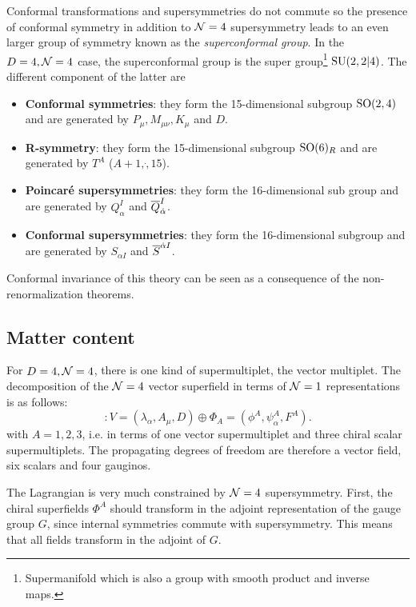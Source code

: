 \documentclass[a4paper,11pt]{article}
\begin{document}
        Conformal transformations and supersymmetries do not commute so the presence of conformal symmetry in addition to $\mathcal{N}=4$ supersymmetry leads to an even larger group of symmetry known as the \emph{superconformal group}. In the $D=4,\mathcal{N}=4$ case, the superconformal group is the super group\footnote{Supermanifold which is also a group with smooth product and inverse maps.} $\text{SU}(2,2|4)$. The different component of the latter are
        \begin{itemize}
            \item \textbf{Conformal symmetries}: they form the 15-dimensional subgroup $\text{SO}(2,4)$ and are generated by $P_\mu,M_{\mu\nu},K_\mu$ and $D$.
            \item \textbf{R-symmetry}: they form the 15-dimensional subgroup $\text{SO}(6)_R$ and are generated by $T^A$ ($A+1,\dot,15$).
            \item \textbf{Poincaré supersymmetries}: they form the 16-dimensional sub group \marker and are generated by $Q^I_\alpha$ and $\overline{Q}^I_{\dot{\alpha}}$.
            \item \textbf{Conformal supersymmetries}: they form the 16-dimensional subgroup \marker and are generated by $S_{\alpha I}$ and $\overline{S}^{\dot{\alpha} I}$.
        \end{itemize}

        Conformal invariance of this theory can be seen as a consequence of the non-renormalization theorems.

    \subsection{Matter content}
        
        For $D=4,\mathcal{N}=4$, there is one kind of supermultiplet, the vector multiplet. The decomposition of the $\mathcal{N} = 4$ vector superfield in terms of $\mathcal{N} = 1$ representations is as follows:
        \begin{equation}
            [\mN = 4 \text{ vector multiplet}] : V = (\lambda_\alpha, A_\mu, D) \oplus \Phi_A = (\phi^A,\psi^A_\alpha,F^A).
        \end{equation}
        with $A=1,2,3$, i.e. in terms of one vector supermultiplet and three chiral scalar supermultiplets. The propagating degrees of freedom are therefore a vector field, six scalars and four gauginos.
        
        The Lagrangian is very much constrained by $\mathcal{N} = 4$ supersymmetry. First, the chiral superfields $\Phi^A$ should transform in the adjoint representation of the gauge group $G$, since internal symmetries commute with supersymmetry. This means that all fields transform in the adjoint of $G$.
        
\end{document}
